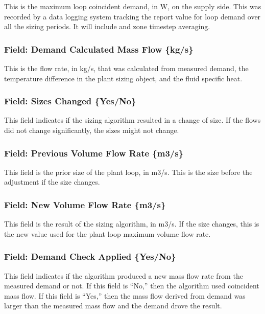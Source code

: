 This is the maximum loop coincident demand, in W, on the supply side. This was recorded by a data logging system tracking the report value for loop demand over all the sizing periods. It will include and zone timestep averaging.

\subsubsection{Field: Demand Calculated Mass Flow \{kg/s\}}\label{field-demand-calculated-mass-flow-kgs}

This is the flow rate, in kg/s, that was calculated from measured demand, the temperature difference in the plant sizing object, and the fluid specific heat.

\subsubsection{Field: Sizes Changed \{Yes/No\}}\label{field-sizes-changed-yesno}

This field indicates if the sizing algorithm resulted in a change of size. If the flows did not change significantly, the sizes might not change.

\subsubsection{Field: Previous Volume Flow Rate \{m3/s\}}\label{field-previous-volume-flow-rate-m3s}

This field is the prior size of the plant loop, in m3/s. This is the size before the adjustment if the size changes.

\subsubsection{Field: New Volume Flow Rate \{m3/s\}}\label{field-new-volume-flow-rate-m3s}

This field is the result of the sizing algorithm, in m3/s. If the size changes, this is the new value used for the plant loop maximum volume flow rate.

\subsubsection{Field: Demand Check Applied \{Yes/No\}}\label{field-demand-check-applied-yesno}

This field indicates if the algorithm produced a new mass flow rate from the measured demand or not. If this field is ``No,'' then the algorithm used coincident mass flow. If this field is ``Yes,'' then the mass flow derived from demand was larger than the measured mass flow and the demand drove the result.

